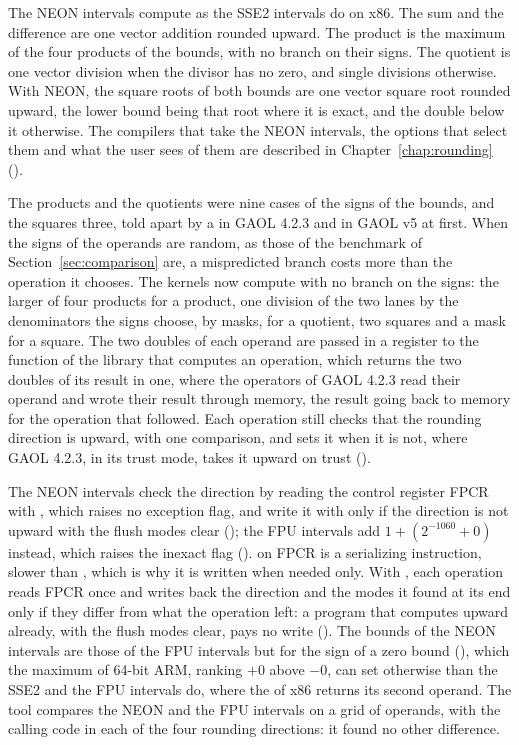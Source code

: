 The NEON intervals compute as the SSE2 intervals do on
x86.\newinvfive{} The sum and the difference are one vector addition rounded
upward. The product is the maximum of the four products of the bounds, with
no branch on their signs. The quotient is one vector division when the
divisor has no zero, and single divisions otherwise. With NEON, the square roots of
both bounds are one vector square root rounded upward, the lower bound being
that root where it is exact, and the double below it otherwise. The compilers
that take the NEON intervals, the options that select them and what the user
sees of them are described in Chapter~\ref{chap:rounding} ().

\medskip
The products and the quotients were nine cases of the signs of the bounds, and the squares three, told apart by a  in GAOL 4.2.3 and in GAOL v5 at
first. When the signs of the operands are random, as those of the benchmark
of Section~\ref{sec:comparison} are, a mispredicted branch costs more than
the operation it chooses. The kernels now compute with no branch on the
signs:\newinvfive{} the larger of four products for a product, one division
of the two lanes by the denominators the signs choose, by masks, for a
quotient, two squares and a mask for a square. The two doubles of each operand
are passed in a register to the function of the library that computes an
operation, which returns the two doubles of its result in one, where the
operators of GAOL 4.2.3 read their operand and wrote their result through
memory, the result going back to memory for the operation that followed.
Each operation still checks that the rounding direction is upward, with one
comparison, and sets it when it is not, where GAOL 4.2.3, in its trust mode, takes it upward on
trust ().

\medskip
The NEON intervals check the direction by reading the control register FPCR
with , which raises no exception flag, and write it with
 only if the direction is not upward with the flush modes clear
(); the FPU intervals add $1+(2^{-1060}+0)$ instead, which
raises the inexact flag ().  on FPCR is a
serializing instruction, slower than , which is why it is written
when needed only. With , each operation
reads FPCR once and writes back the direction and the modes it found at its
end only if they differ from what the operation left: a program that
computes upward already, with the flush modes clear, pays no write
(). The bounds of the NEON intervals are those
of the FPU intervals but for the sign of a zero bound (),
which the maximum of 64-bit ARM, ranking $+0$ above $-0$, can set otherwise
than the SSE2 and the FPU intervals do, where the  of x86
returns its second operand. The tool  compares the
NEON and the FPU intervals on a grid of operands, with the calling code in
each of the four rounding directions: it found no other difference.

